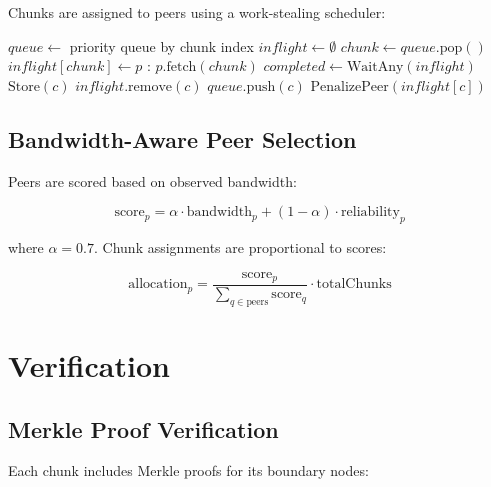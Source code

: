 \documentclass[11pt,a4paper]{article}
\begin{document}
Chunks are assigned to peers using a work-stealing scheduler:

\begin{algorithm}
\caption{Adaptive Chunk Scheduling}
\begin{algorithmic}[1]
    \State $queue \gets$ priority queue by chunk index
    \State $inflight \gets \emptyset$
                \State $chunk \gets queue.\text{pop}()$
                \State $inflight[chunk] \gets p$
                \State {}: $p.\text{fetch}(chunk)$
            \EndIf
        \EndFor
        \State $completed \gets \text{WaitAny}(inflight)$
                \State $\text{Store}(c)$
                \State $inflight.\text{remove}(c)$
            \Else
                \State $queue.\text{push}(c)$ 
                \State $\text{PenalizePeer}(inflight[c])$
            \EndIf
        \EndFor
    \EndWhile
\EndProcedure
\end{algorithmic}
\end{algorithm}

\subsection{Bandwidth-Aware Peer Selection}

Peers are scored based on observed bandwidth:

\[
\text{score}_p = \alpha \cdot \text{bandwidth}_p + (1 - \alpha) \cdot \text{reliability}_p
\]

where $\alpha = 0.7$. Chunk assignments are proportional to scores:

\[
\text{allocation}_p = \frac{\text{score}_p}{\sum_{q \in \text{peers}} \text{score}_q} \cdot \text{totalChunks}
\]

\section{Verification}

\subsection{Merkle Proof Verification}

Each chunk includes Merkle proofs for its boundary nodes:
\end{document}
